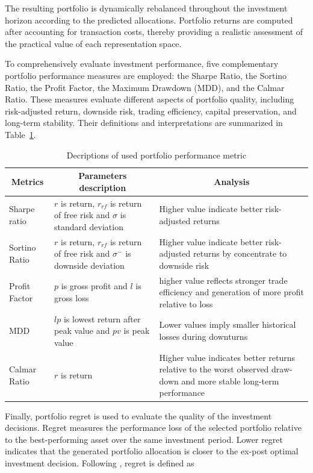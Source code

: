 \documentclass[preprint,12pt]{elsarticle}
\theoremstyle{plain}
\theoremstyle{definition}
\begin{document}
The resulting portfolio is dynamically rebalanced throughout the investment horizon according to the predicted allocations. Portfolio returns are computed after accounting for transaction costs, thereby providing a realistic assessment of the practical value of each representation space.

To comprehensively evaluate investment performance, five complementary portfolio performance measures are employed: the Sharpe Ratio, the Sortino Ratio, the Profit Factor, the Maximum Drawdown (MDD), and the Calmar Ratio. These measures evaluate different aspects of portfolio quality, including risk-adjusted return, downside risk, trading efficiency, capital preservation, and long-term stability. Their definitions and interpretations are summarized in Table~\ref{tab:protfolioperformane_measures}.
	\begin{table}[]
	\centering
	\scriptsize
	\caption{\label{tab:protfolioperformane_measures}Decriptions of used portfolio performance metric}
	
	\begin{tabular}{|p{2.3cm} p{5cm} p{5 cm}|} \hline 
		\multicolumn{1}{|c}{\textbf{Metrics}} & 
		\multicolumn{1}{c}{\textbf{Parameters description}} & \multicolumn{1}{c|}{\textbf{Analysis}}   \\ \hline 
		Sharpe ratio &  \( r\) is return, \( r_{rf}\) is return of free risk and \(\sigma \) is standard deviation & Higher value indicate better risk-adjusted returns  \\  
		Sortino Ratio &  \( r\) is return, \( r_{rf}\) is return of free risk and \(\sigma^- \) is downside deviation & Higher value indicate better risk-adjusted returns by concentrate to downside risk  \\ 
		Profit Factor & \(p \) is gross profit and \(l \) is gross loss & higher value reflects stronger trade efficiency and generation of more profit relative to loss \\  
		MDD & \(lp \) is lowest return after peak value and \(pv \) is peak value & Lower values imply smaller historical losses during downturns  \\  
		Calmar Ratio & \( r\) is return & Higher value indicates better returns relative to the worst observed draw-down and more stable long-term performance  \\ \hline 
	\end{tabular}
\end{table}
Finally, portfolio regret is used to evaluate the quality of the investment decisions. Regret measures the performance loss of the selected portfolio relative to the best-performing asset over the same investment period. Lower regret indicates that the generated portfolio allocation is closer to the ex-post optimal investment decision. Following \cite{baule2019markowitz}, regret is defined as
\end{document}
